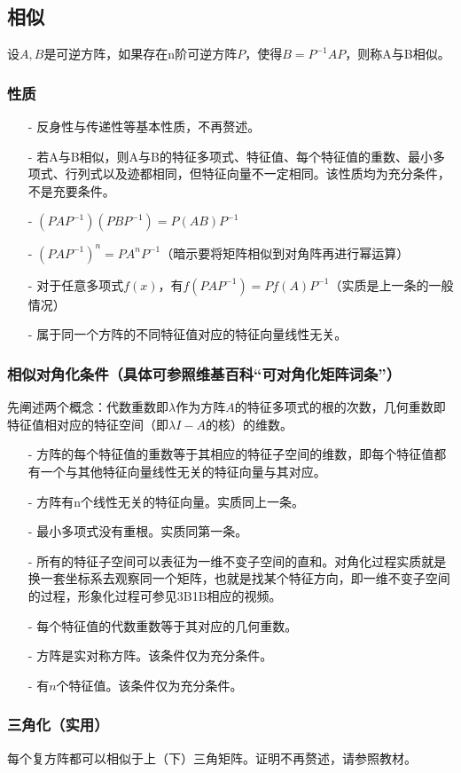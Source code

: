 \documentclass[UTF8]{ctexart}
\begin{document}
\subsection{相似}
设$A,B$是可逆方阵，如果存在n阶可逆方阵$P$，使得$B=P^{-1}AP$，则称A与B相似。
\subsubsection{性质}
\begin{itemize}
	\item [-]反身性与传递性等基本性质，不再赘述。
	\item [-]若A与B相似，则A与B的特征多项式、特征值、每个特征值的重数、最小多项式、行列式以及迹都相同，但特征向量不一定相同。该性质均为充分条件，不是充要条件。
	\item [-]$(PAP^{-1})(PBP^{-1})=P(AB)P^{-1}$
	\item [-]$(PAP^{-1})^{n}=PA^{n}P^{-1}$（暗示要将矩阵相似到对角阵再进行幂运算）
	\item [-]对于任意多项式$f(x)$，有$f(PAP^{-1})=Pf(A)P^{-1}$（实质是上一条的一般情况）
	\item [-]属于同一个方阵的不同特征值对应的特征向量线性无关。
\end{itemize}
\subsubsection{相似对角化条件（具体可参照维基百科“可对角化矩阵词条”）}
先阐述两个概念：代数重数即$\lambda$作为方阵$A$的特征多项式的根的次数，几何重数即特征值相对应的特征空间（即$\lambda I -A$的核）的维数。
\begin{itemize}
	\item [-]方阵的每个特征值的重数等于其相应的特征子空间的维数，即每个特征值都有一个与其他特征向量线性无关的特征向量与其对应。
	\item [-]方阵有n个线性无关的特征向量。实质同上一条。
	\item [-]最小多项式没有重根。实质同第一条。
	\item [-]所有的特征子空间可以表征为一维不变子空间的直和。对角化过程实质就是换一套坐标系去观察同一个矩阵，也就是找某个特征方向，即一维不变子空间的过程，形象化过程可参见3B1B相应的视频。
	\item [-]每个特征值的代数重数等于其对应的几何重数。
	\item [-]方阵是实对称方阵。该条件仅为充分条件。
    \item [-]有$n$个特征值。该条件仅为充分条件。
\end{itemize}
	      \subsubsection{三角化（实用）}
          每个复方阵都可以相似于上（下）三角矩阵。证明不再赘述，请参照教材。
\end{document}
